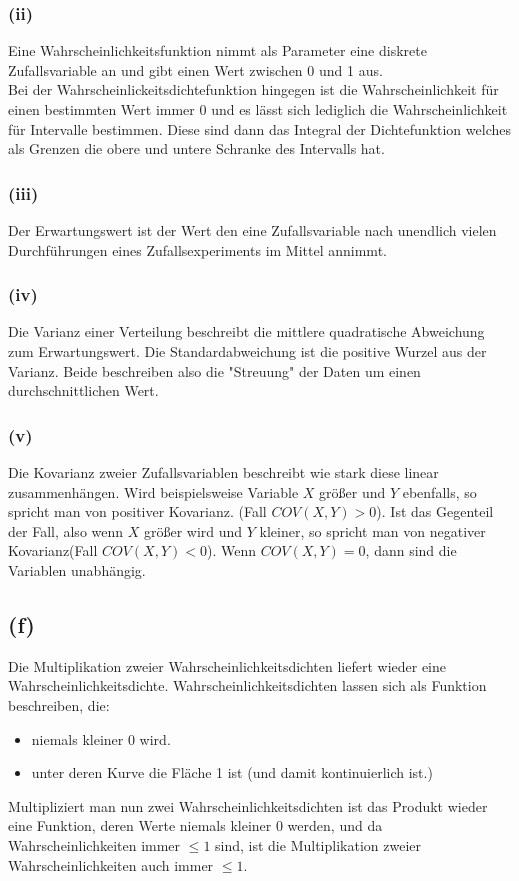 \documentclass[a4paper]{scrartcl}
\begin{document}
\subsubsection*{(ii)}
Eine Wahrscheinlichkeitsfunktion nimmt als Parameter eine diskrete Zufallsvariable an und gibt einen Wert zwischen 0 und 1 aus.\\
Bei der Wahrscheinlickeitsdichtefunktion hingegen ist die Wahrscheinlichkeit für einen bestimmten Wert immer 0 und es lässt sich lediglich die Wahrscheinlichkeit für Intervalle bestimmen. Diese sind dann das Integral der Dichtefunktion welches als Grenzen die obere und untere Schranke des Intervalls hat.

\subsubsection*{(iii)} 
Der Erwartungswert ist der Wert den eine Zufallsvariable nach unendlich vielen Durchführungen eines Zufallsexperiments im Mittel annimmt.

\subsubsection*{(iv)} 
Die Varianz einer Verteilung beschreibt die mittlere quadratische Abweichung zum Erwartungswert. Die Standardabweichung ist die positive Wurzel aus der Varianz. Beide beschreiben also die "Streuung" der Daten um einen durchschnittlichen Wert.

\subsubsection*{(v)} %
Die Kovarianz zweier Zufallsvariablen beschreibt wie stark diese linear zusammenhängen. Wird beispielsweise Variable $X$ größer und $Y$ ebenfalls, so spricht man von positiver Kovarianz. (Fall $COV(X,Y)> 0$). Ist das Gegenteil der Fall, also wenn $X$ größer wird und $Y$ kleiner, so spricht man von negativer Kovarianz(Fall $COV(X,Y) < 0$). Wenn $COV(X,Y)=0$, dann sind die Variablen unabhängig.



\subsection*{(f)}
Die Multiplikation zweier Wahrscheinlichkeitsdichten liefert wieder eine Wahrscheinlichkeitsdichte. Wahrscheinlichkeitsdichten lassen sich als Funktion beschreiben, die:
\begin{itemize}
	\item niemals kleiner 0 wird.
	\item unter deren Kurve die Fläche 1 ist (und damit kontinuierlich ist.)
\end{itemize}
Multipliziert man nun zwei Wahrscheinlichkeitsdichten ist das Produkt wieder eine Funktion, deren Werte niemals kleiner 0 werden, und da Wahrscheinlichkeiten immer $\leq 1$ sind, ist die Multiplikation zweier Wahrscheinlichkeiten auch immer $\leq 1$. 
\end{document}

